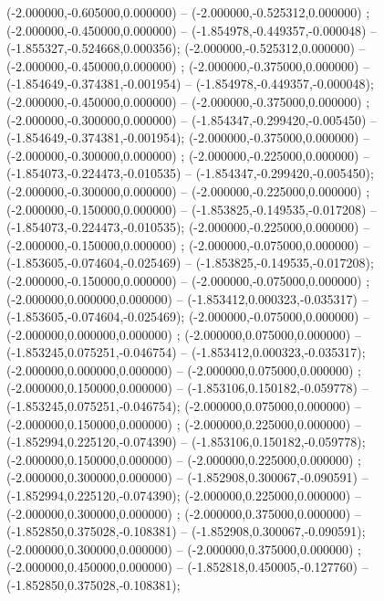  (-2.000000,-0.605000,0.000000) -- (-2.000000,-0.525312,0.000000) ;
 (-2.000000,-0.450000,0.000000) -- (-1.854978,-0.449357,-0.000048) -- (-1.855327,-0.524668,0.000356);
 (-2.000000,-0.525312,0.000000) -- (-2.000000,-0.450000,0.000000) ;
 (-2.000000,-0.375000,0.000000) -- (-1.854649,-0.374381,-0.001954) -- (-1.854978,-0.449357,-0.000048);
 (-2.000000,-0.450000,0.000000) -- (-2.000000,-0.375000,0.000000) ;
 (-2.000000,-0.300000,0.000000) -- (-1.854347,-0.299420,-0.005450) -- (-1.854649,-0.374381,-0.001954);
 (-2.000000,-0.375000,0.000000) -- (-2.000000,-0.300000,0.000000) ;
 (-2.000000,-0.225000,0.000000) -- (-1.854073,-0.224473,-0.010535) -- (-1.854347,-0.299420,-0.005450);
 (-2.000000,-0.300000,0.000000) -- (-2.000000,-0.225000,0.000000) ;
 (-2.000000,-0.150000,0.000000) -- (-1.853825,-0.149535,-0.017208) -- (-1.854073,-0.224473,-0.010535);
 (-2.000000,-0.225000,0.000000) -- (-2.000000,-0.150000,0.000000) ;
 (-2.000000,-0.075000,0.000000) -- (-1.853605,-0.074604,-0.025469) -- (-1.853825,-0.149535,-0.017208);
 (-2.000000,-0.150000,0.000000) -- (-2.000000,-0.075000,0.000000) ;
 (-2.000000,0.000000,0.000000) -- (-1.853412,0.000323,-0.035317) -- (-1.853605,-0.074604,-0.025469);
 (-2.000000,-0.075000,0.000000) -- (-2.000000,0.000000,0.000000) ;
 (-2.000000,0.075000,0.000000) -- (-1.853245,0.075251,-0.046754) -- (-1.853412,0.000323,-0.035317);
 (-2.000000,0.000000,0.000000) -- (-2.000000,0.075000,0.000000) ;
 (-2.000000,0.150000,0.000000) -- (-1.853106,0.150182,-0.059778) -- (-1.853245,0.075251,-0.046754);
 (-2.000000,0.075000,0.000000) -- (-2.000000,0.150000,0.000000) ;
 (-2.000000,0.225000,0.000000) -- (-1.852994,0.225120,-0.074390) -- (-1.853106,0.150182,-0.059778);
 (-2.000000,0.150000,0.000000) -- (-2.000000,0.225000,0.000000) ;
 (-2.000000,0.300000,0.000000) -- (-1.852908,0.300067,-0.090591) -- (-1.852994,0.225120,-0.074390);
 (-2.000000,0.225000,0.000000) -- (-2.000000,0.300000,0.000000) ;
 (-2.000000,0.375000,0.000000) -- (-1.852850,0.375028,-0.108381) -- (-1.852908,0.300067,-0.090591);
 (-2.000000,0.300000,0.000000) -- (-2.000000,0.375000,0.000000) ;
 (-2.000000,0.450000,0.000000) -- (-1.852818,0.450005,-0.127760) -- (-1.852850,0.375028,-0.108381);
